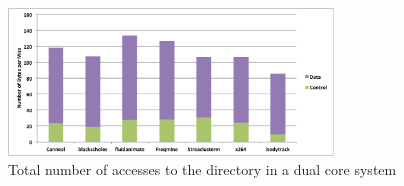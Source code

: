 \begin{figure}[h]
  \centering
  \includegraphics[height = 2.8 in, width=3.4in]{figures/figure1.pdf}
  \caption{Total number of accesses to the directory in a dual core system}
  \label{fig:profile}
\end{figure}

